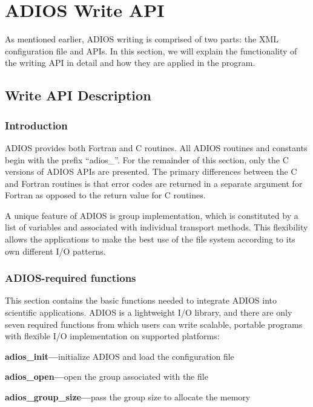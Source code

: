 \chapter{ADIOS Write API}

As mentioned earlier, ADIOS writing is comprised of two parts: the XML configuration 
file and APIs. In this section, we will explain the functionality of the writing 
API in detail and how they are applied in the program.  

\section{Write API Description}

\subsection{Introduction}

ADIOS provides both Fortran and C routines. All ADIOS routines and constants begin 
with the prefix ``adios\_''. For the remainder of this section, only the C versions 
of ADIOS APIs are presented. The primary differences between the C and Fortran 
routines is that error codes are returned in a separate argument for Fortran as 
opposed to the return value for C routines. 

A unique feature of ADIOS is group implementation, which is constituted by a list 
of variables and associated with individual transport methods. This flexibility 
allows the applications to make the best use of the file system according to its 
own different I/O patterns.\label{HToc84890236}\label{HToc212016612}\label{HToc212016854}\label{HToc182553350}

\subsection{ADIOS-required functions}

This section contains the basic functions needed to integrate ADIOS into scientific 
applications. ADIOS is a lightweight I/O library, and there are only seven required 
functions from which users can write scalable, portable programs with flexible 
I/O implementation on supported platforms:

\textbf{adios\_init---}initialize ADIOS and load the configuration file

\textbf{adios\_open---}open the group associated with the file

\textbf{adios\_group\_size---}pass the group size to allocate the memory

